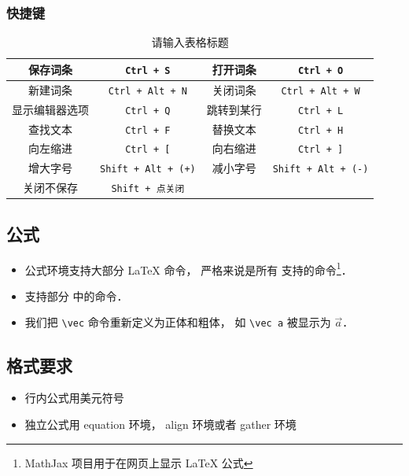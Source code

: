 \subsubsection{快捷键}

\begin{table}[ht]
\centering
\caption{请输入表格标题}\label{editor_tab1}
\begin{tabular}{|c|c|c|c|}
\hline
保存词条 & \lstinline|Ctrl + S| & 打开词条 & \lstinline|Ctrl + O| \\
\hline
新建词条 & \lstinline|Ctrl + Alt + N| & 关闭词条 & \lstinline|Ctrl + Alt + W| \\
\hline
显示编辑器选项 & \lstinline|Ctrl + Q| & 跳转到某行 & \lstinline|Ctrl + L| \\
\hline
查找文本 & \lstinline|Ctrl + F| & 替换文本 & \lstinline|Ctrl + H| \\
\hline
向左缩进 & \lstinline|Ctrl + [| & 向右缩进 & \lstinline|Ctrl + ]| \\
\hline
增大字号 & \lstinline|Shift + Alt + (+)| & 减小字号 & \lstinline|Shift + Alt + (-)| \\
\hline
关闭不保存 & \lstinline|Shift + 点关闭| &  &  \\
\hline
\end{tabular}
\end{table}

\subsection{公式}
\begin{itemize}
\item 公式环境支持大部分 LaTeX 命令， 严格来说是所有  支持的命令\footnote{MathJax 项目用于在网页上显示 LaTeX 公式}．
\item 支持部分 中的命令．
\item 我们把 \lstinline|\vec| 命令重新定义为正体和粗体， 如 \lstinline|\vec a| 被显示为 $\vec a$．
\end{itemize}

\subsection{格式要求}

\begin{itemize}
\item 行内公式用美元符号
\item 独立公式用 equation 环境， align 环境或者 gather 环境
\end{itemize}
